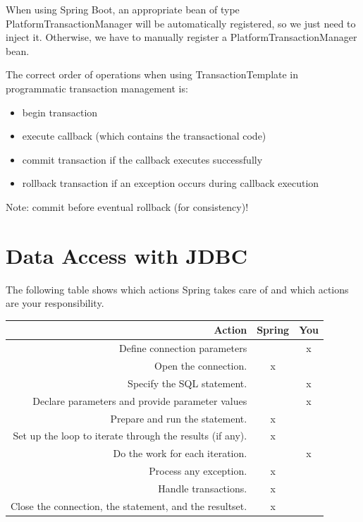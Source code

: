 \documentclass{scrartcl}
\begin{document}
When using Spring Boot, an appropriate bean of type PlatformTransactionManager will be automatically registered, so we just need to inject it. Otherwise, we have to manually register a PlatformTransactionManager bean.

The correct order of operations when using TransactionTemplate in programmatic transaction management is:

\begin{itemize}
    \item begin transaction
    \item execute callback (which contains the transactional code)
    \item commit transaction if the callback executes successfully
    \item rollback transaction if an exception occurs during callback execution
\end{itemize}

Note: commit before eventual rollback (for consistency)!

\section{Data Access with JDBC}

The following table shows which actions Spring takes care of and which actions are your responsibility.

\begin{table}[h!]
\begin{tabular}{|r|c|c|}
    \hline
    Action&  Spring&  You\\
    \hline
    Define connection parameters&  &  x\\
    \hline
    Open the connection.&  x&  \\
    \hline
    Specify the SQL statement.&  &  x\\
    \hline
    Declare parameters and provide parameter values&  &  x\\
    \hline
    Prepare and run the statement.&  x&  \\
    \hline
    Set up the loop to iterate through the results (if any).&  x&  \\
    \hline
    Do the work for each iteration.&  &  x\\
    \hline
    Process any exception.&  x&  \\
    \hline
    Handle transactions.&  x&  \\
    \hline
    Close the connection, the statement, and the resultset.&  x&  \\
    \hline
\end{tabular}
\end{table}
\end{document}
